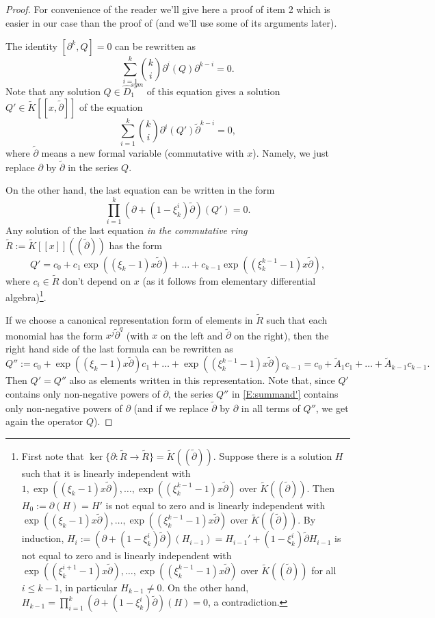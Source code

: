 \documentclass[11pt]{article}
\theoremstyle{definition}
\theoremstyle{plain}
\numberwithin{equation}{section}
\begin{document}
\begin{proof}
For convenience of the reader we'll give here a proof of item 2 which is easier in our case than the  proof of  \cite[Prop. 7.1]{A.Z} (and we'll use some of its arguments later).

The identity $[\partial^k, Q]=0$ can be rewritten as 
\begin{equation}
\label{E:comm}
\sum_{i=1}^k \binom{k}{i}  \partial^i(Q)\partial^{k-i}=0. 
\end{equation}
Note that any solution $Q\in \hat{D}_1^{sym}$ of this equation gives a solution 
$Q'\in \tilde{K}[[x, \tilde{\partial}]]$ of the equation  
$$
\sum_{i=1}^k \binom{k}{i} \partial^i(Q')\tilde{\partial}^{k-i}=0,
$$
where $\tilde{\partial}$ means a new formal variable (commutative with  $x$). Namely, we just replace $\partial$ by $\tilde{\partial}$ in the series $Q$. 

On the other hand, the last equation can be written in the form 
$$
\prod_{i=1}^k(\partial+ (1-\xi_k^i)\tilde{\partial})(Q')=0.
$$
Any solution of the last equation {\it in the commutative ring} 
$\tilde{R}:=\tilde{K}[[x]]((\tilde{\partial}))$ has the form
$$
Q'= c_0 +c_1 \exp ((\xi_k-1)x\tilde{\partial}) +\ldots +c_{k-1}\exp ((\xi_k^{k-1}-1)x\tilde{\partial}), 
$$
where $c_i\in \tilde{R}$ don't depend on $x$ (as it follows from elementary differential algebra)\footnote{First note that $\ker\{\partial : \tilde{R}\rightarrow \tilde{R}\}=\tilde{K}((\tilde{\partial}))$. Suppose there is a solution $H$ such that it is linearly independent with $1,   \exp ((\xi_k-1)x\tilde{\partial}), \ldots , \exp ((\xi_k^{k-1}-1)x\tilde{\partial})$ over $\tilde{K}((\tilde{\partial}))$. Then $H_0:=\partial (H)=H'$ is not equal to zero and is linearly independent with  $\exp ((\xi_k-1)x\tilde{\partial}), \ldots , \exp ((\xi_k^{k-1}-1)x\tilde{\partial})$ over $\tilde{K}((\tilde{\partial}))$. By induction, $H_i:=(\partial+ (1-\xi_k^i)\tilde{\partial})(H_{i-1})=H_{i-1}'+ (1-\xi_k^i)\tilde{\partial} H_{i-1}$ is not equal to zero and is linearly independent with  $\exp ((\xi_k^{i+1}-1)x\tilde{\partial}), \ldots , \exp ((\xi_k^{k-1}-1)x\tilde{\partial})$ over $\tilde{K}((\tilde{\partial}))$ for all $i\le k-1$, in particular $H_{k-1}\neq 0$. On the other hand, $H_{k-1}=\prod_{i=1}^k(\partial+ (1-\xi_k^i)\tilde{\partial})(H)=0$, a contradiction.}.


If we choose a canonical representation form of elements in $\tilde{R}$ such that each monomial has the form $x^{j}\tilde{\partial}^{q}$ (with $x$ on the left and 
$\tilde{\partial}$ on the right), then the right hand side of the last formula can be rewritten as 
\begin{equation}
\label{E:summand'}
Q'':=c_0+\exp ((\xi_k-1)x\tilde{\partial})c_1+\ldots + \exp ((\xi_k^{k-1}-1)x\tilde{\partial})c_{k-1}=c_0+\tilde{A}_1c_1+\ldots + \tilde{A}_{k-1}c_{k-1}.
\end{equation}
Then $Q'=Q''$ also as elements written in this representation. Note that, since $Q'$ contains only non-negative powers of $\partial$, the series $Q''$ in \eqref{E:summand'} contains only non-negative powers of $\partial$  (and if we replace $\tilde{\partial}$ by $\partial$ in all terms of $Q''$, we get again the operator $Q$).  


\end{proof}
\end{document}
